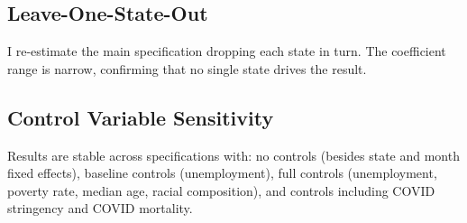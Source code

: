 \documentclass[12pt]{article}
\begin{document}
\subsection{Leave-One-State-Out}

I re-estimate the main specification dropping each state in turn. The coefficient range is narrow, confirming that no single state drives the result.

\subsection{Control Variable Sensitivity}

Results are stable across specifications with: no controls (besides state and month fixed effects), baseline controls (unemployment), full controls (unemployment, poverty rate, median age, racial composition), and controls including COVID stringency and COVID mortality.
\end{document}
